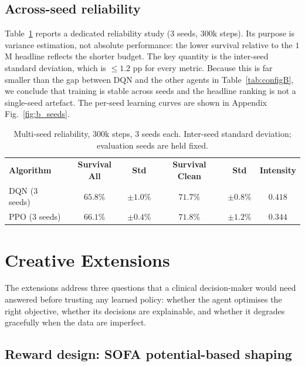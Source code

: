 \documentclass[11pt,a4paper]{article}
\newcommand{\tH}[1]{\textcolor{novagreen}{\textbf{#1}}}
\newcommand{\gmid}{\arrayrulecolor{novagreen}\midrule\arrayrulecolor{black}}
\begin{document}
\subsection{Across-seed reliability}
\label{sec:seeds}

Table~\ref{tab:seeds} reports a dedicated reliability study ($3$ seeds, $300$k
steps). Its purpose is variance estimation, not absolute performance: the lower
survival relative to the $1$M headline reflects the shorter budget. The key
quantity is the inter-seed standard deviation, which is $\leq1.2$ pp for every
metric. Because this is far smaller than the gap between DQN and the other agents
in Table~\ref{tab:configB}, we conclude that training is stable across seeds and
the headline ranking is not a single-seed artefact. The per-seed learning curves
are shown in Appendix Fig.~\ref{fig:b_seeds}.

\begin{table}[H]
\centering
\begin{tabular}{lccccc}
\toprule
\tH{Algorithm} & \tH{Survival All} & \tH{Std} & \tH{Survival Clean} & \tH{Std} & \tH{Intensity} \\
\gmid
DQN (3 seeds) & $65.8\%$ & $\pm1.0\%$ & $71.7\%$ & $\pm0.8\%$ & $0.418$ \\
PPO (3 seeds) & $66.1\%$ & $\pm0.4\%$ & $71.8\%$ & $\pm1.2\%$ & $0.344$ \\
\bottomrule
\end{tabular}
\caption{Multi-seed reliability, $300$k steps, $3$ seeds each.
Inter-seed standard deviation; evaluation seeds are held fixed.}
\label{tab:seeds}
\end{table}


\section{Creative Extensions}
\label{sec:ext}

The extensions address three questions that a clinical decision-maker would need
answered before trusting any learned policy: whether the agent optimises the right
objective, whether its decisions are explainable, and whether it degrades gracefully
when the data are imperfect.

\subsection{Reward design: SOFA potential-based shaping}
\label{sec:shaping}
\end{document}
